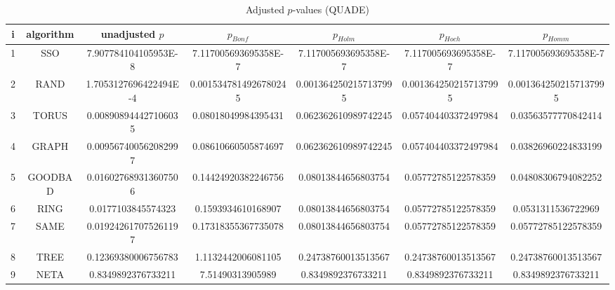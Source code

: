 \documentclass[a4paper,10pt]{article}
\begin{document}
\begin{landscape}
\begin{table}[!htp]
\centering\scriptsize
\caption{Adjusted $p$-values (QUADE)}
\begin{tabular}{ccccccc}
i&algorithm&unadjusted $p$&$p_{Bonf}$&$p_{Holm}$&$p_{Hoch}$&$p_{Homm}$\\
\hline
1& SSO&7.907784104105953E-8&7.117005693695358E-7&7.117005693695358E-7&7.117005693695358E-7&7.117005693695358E-7\\
2& RAND&1.7053127696422494E-4&0.0015347814926780245&0.0013642502157137995&0.0013642502157137995&0.0013642502157137995\\
3& TORUS&0.008908944427106035&0.08018049984395431&0.062362610989742245&0.057404403372497984&0.03563577770842414\\
4& GRAPH&0.009567400562082997&0.08610660505874697&0.062362610989742245&0.057404403372497984&0.03826960224833199\\
5& GOODBAD&0.016027689313607506&0.14424920382246756&0.08013844656803754&0.05772785122578359&0.04808306794082252\\
6& RING&0.0177103845574323&0.1593934610168907&0.08013844656803754&0.05772785122578359&0.0531311536722969\\
7& SAME&0.019242617075261197&0.17318355367735078&0.08013844656803754&0.05772785122578359&0.05772785122578359\\
8& TREE&0.12369380006756783&1.1132442006081105&0.24738760013513567&0.24738760013513567&0.24738760013513567\\
9& NETA&0.8349892376733211&7.51490313905989&0.8349892376733211&0.8349892376733211&0.8349892376733211\\
\hline
\end{tabular}
\end{table}


\end{landscape}
\end{document}
